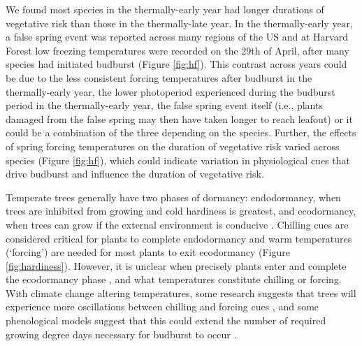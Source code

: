 \documentclass{article}\usepackage[]{graphicx}\usepackage[]{color}
\begin{document}
We found most species in the thermally-early year had longer durations of vegetative risk than those in the thermally-late year. In the thermally-early year, a false spring event was reported across many regions of the US and at Harvard Forest low freezing temperatures were recorded on the 29th of April, after many species had initiated budburst (Figure \ref{fig:hf}). This contrast across years could be due to the less consistent forcing temperatures after budburst in the thermally-early year, the lower photoperiod experienced during the budburst period in the thermally-early year, the false spring event itself (i.e., plants damaged from the false spring may then have taken longer to reach leafout) or it could be a combination of the three depending on the species. Further, the effects of spring forcing temperatures on the duration of vegetative risk varied across species (Figure \ref{fig:hf}), which could indicate variation in physiological cues that drive budburst and influence the duration of vegetative risk.

Temperate trees generally have two phases of dormancy: endodormancy, when trees are inhibited from growing and cold hardiness is greatest, and ecodormancy, when trees can grow if the external environment is conducive \citep{Basler2012}. Chilling cues are considered critical for plants to complete endodormancy and warm temperatures (`forcing') are needed for most plants to exit ecodormancy (Figure \ref{fig:hardiness}). However, it is unclear when precisely plants enter and complete the ecodormancy phase \citep{Chuine2016}, and what temperatures constitute chilling or forcing. With climate change altering temperatures, some research suggests that trees will experience more oscillations between chilling and forcing cues \citep{Martin2010}, and some phenological models suggest that this could extend the number of required growing degree days necessary for budburst to occur \citep{Vitasse2011}.
%
\end{document}
